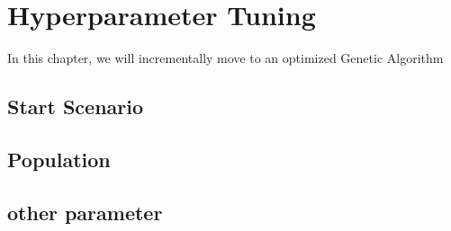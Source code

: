 \chapter{Hyperparameter Tuning}
In this chapter, we will incrementally move to an optimized Genetic Algorithm
\section{Start Scenario}

\section{Population}

\section{other parameter}